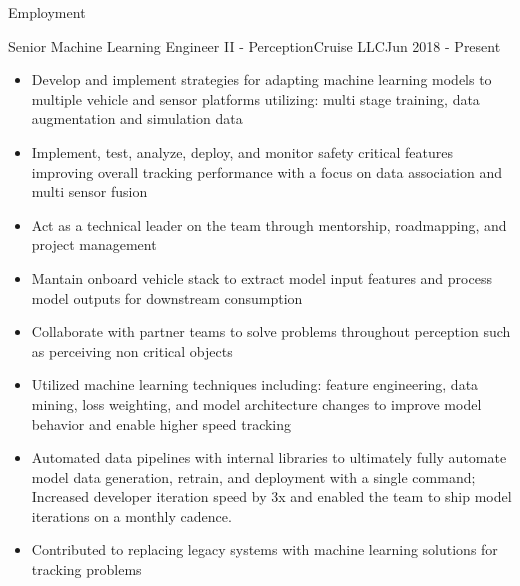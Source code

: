 \documentclass[]{mcdowellcv}
\begin{document}
\makeheader

\begin{cvsection}{Employment}

\begin{cruise}
    \begin{cvsubsection}{Senior Machine Learning Engineer II - Perception}{Cruise LLC}{Jun 2018 - Present}
        \begin{itemize}
            \item Develop and implement strategies for adapting machine learning models to multiple vehicle and sensor platforms utilizing: multi stage training, data augmentation and simulation data 
            \item Implement, test, analyze, deploy, and monitor safety critical features improving overall tracking performance with a focus on data association and multi sensor fusion
            \item Act as a technical leader on the team through mentorship, roadmapping, and project management
            \item Mantain onboard vehicle stack to extract model input features and process model outputs for downstream consumption 
            \item Collaborate with partner teams to solve problems throughout perception such as perceiving non critical objects
            \item Utilized machine learning techniques including: feature engineering, data mining, loss weighting, and model architecture changes to improve model behavior and enable higher speed tracking 
            \item Automated data pipelines with internal libraries to ultimately fully automate model data generation, retrain, and deployment with a single command; Increased developer iteration speed by 3x and enabled the team to ship model iterations on a monthly cadence.
            \item Contributed to replacing legacy systems with machine learning solutions for tracking problems
        \end{itemize}
    \end{cvsubsection}
\end{cruise}


\end{cvsection}
\end{document}
